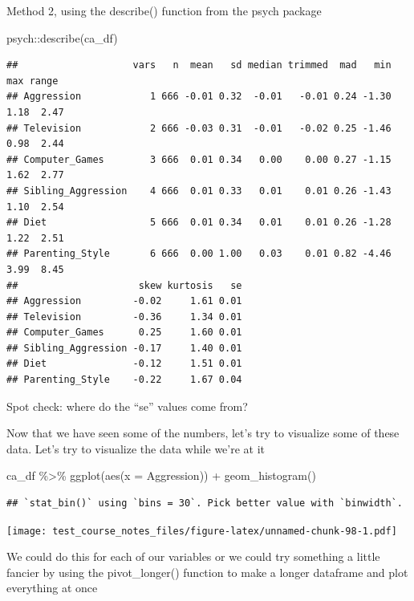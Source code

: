 \documentclass[
]{book}
\newenvironment{Shaded}{\begin{snugshade}}{\end{snugshade}}
\newcommand{\AttributeTok}[1]{\textcolor[rgb]{0.77,0.63,0.00}{#1}}
\newcommand{\FunctionTok}[1]{\textcolor[rgb]{0.00,0.00,0.00}{#1}}
\newcommand{\NormalTok}[1]{#1}
\newcommand{\SpecialCharTok}[1]{\textcolor[rgb]{0.00,0.00,0.00}{#1}}
\begin{document}
Method 2, using the describe() function from the psych package

\begin{Shaded}
\begin{Highlighting}[]
\NormalTok{psych}\SpecialCharTok{::}\FunctionTok{describe}\NormalTok{(ca\_df)}
\end{Highlighting}
\end{Shaded}

\begin{verbatim}
##                    vars   n  mean   sd median trimmed  mad   min  max range
## Aggression            1 666 -0.01 0.32  -0.01   -0.01 0.24 -1.30 1.18  2.47
## Television            2 666 -0.03 0.31  -0.01   -0.02 0.25 -1.46 0.98  2.44
## Computer_Games        3 666  0.01 0.34   0.00    0.00 0.27 -1.15 1.62  2.77
## Sibling_Aggression    4 666  0.01 0.33   0.01    0.01 0.26 -1.43 1.10  2.54
## Diet                  5 666  0.01 0.34   0.01    0.01 0.26 -1.28 1.22  2.51
## Parenting_Style       6 666  0.00 1.00   0.03    0.01 0.82 -4.46 3.99  8.45
##                     skew kurtosis   se
## Aggression         -0.02     1.61 0.01
## Television         -0.36     1.34 0.01
## Computer_Games      0.25     1.60 0.01
## Sibling_Aggression -0.17     1.40 0.01
## Diet               -0.12     1.51 0.01
## Parenting_Style    -0.22     1.67 0.04
\end{verbatim}

Spot check: where do the ``se'' values come from?

Now that we have seen some of the numbers, let's try to visualize some of these data. Let's try to visualize the data while we're at it

\begin{Shaded}
\begin{Highlighting}[]
\NormalTok{ca\_df }\SpecialCharTok{\%\textgreater{}\%} 
  \FunctionTok{ggplot}\NormalTok{(}\FunctionTok{aes}\NormalTok{(}\AttributeTok{x =}\NormalTok{ Aggression)) }\SpecialCharTok{+}
  \FunctionTok{geom\_histogram}\NormalTok{()}
\end{Highlighting}
\end{Shaded}

\begin{verbatim}
## `stat_bin()` using `bins = 30`. Pick better value with `binwidth`.
\end{verbatim}

\texttt{[image: test\_course\_notes\_files/figure-latex/unnamed-chunk-98-1.pdf]}

We could do this for each of our variables or we could try something a little fancier by using the pivot\_longer() function to make a longer dataframe and plot everything at once
\end{document}

